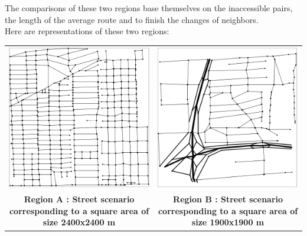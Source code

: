 The comparisons of these two regions base themselves on the inaccessible pairs, the length of the average route and to finish the changes of neighbors.\\

Here are representations of these two regions:\\

\begin{tabular}{cc}
   \includegraphics{../images/cityA.png} &
   \includegraphics{../images/cityB.png} \\
   \textbf{Region A : Street scenario corresponding to a square area of size 2400x2400 m\cite{EfficientDataMobileSensor4}} &
   \textbf{Region B : Street scenario corresponding to a square area of size 1900x1900 m\cite{EfficientDataMobileSensor4}}   
\end{tabular}

\newpage

